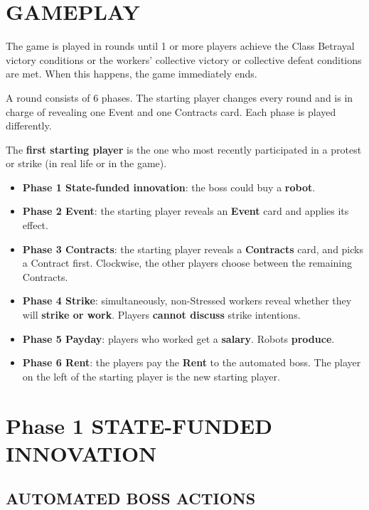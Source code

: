\section{GAMEPLAY}

    The game is played in rounds until 1 or more players achieve the Class Betrayal
    victory conditions or the workers' collective victory or collective defeat conditions
    are met. When this happens, the game immediately ends.
    
    A round consists of 6 phases. The starting player changes every round and is in
    charge of revealing one Event and one Contracts card. Each phase is played differently.
    
    The \textbf{first starting player} is the one who most recently participated in a protest
    or strike (in real life or in the game).

    \begin{itemize}
        \item \textbf{Phase 1 State-funded innovation}: the boss could buy a \textbf{robot}.
        \item \textbf{Phase 2 Event}: the starting player reveals an \textbf{Event} card and applies its effect.
        \item \textbf{Phase 3 Contracts}: the starting player reveals a \textbf{Contracts} card, and picks
        a Contract first. Clockwise, the other players choose between the remaining
        Contracts.
        \item \textbf{Phase 4 Strike}: simultaneously, non-Stressed workers reveal whether they
        will \textbf{strike or work}. Players \textbf{cannot discuss} strike intentions.
        \item \textbf{Phase 5 Payday}: players who worked get a \textbf{salary}. Robots \textbf{produce}.
        \item \textbf{Phase 6 Rent}: the players pay the \textbf{Rent} to the automated boss. The player
        on the left of the starting player is the new starting player.
    \end{itemize}



\section{Phase 1 STATE-FUNDED INNOVATION}

    \subsection{AUTOMATED BOSS ACTIONS}
    
